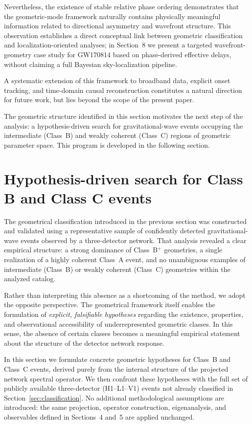 \documentclass[11pt,a4paper]{article}
\begin{document}
Nevertheless, the existence of stable relative phase ordering demonstrates that the
geometric-mode framework naturally contains physically meaningful information related to
directional asymmetry and wavefront structure.
This observation establishes a direct conceptual link between geometric classification
and localization-oriented analyses; in Section~8 we present a targeted wavefront-geometry
case study for GW170814 based on phase-derived effective delays, without claiming a full
Bayesian sky-localization pipeline.

A systematic extension of this framework to broadband data, explicit onset tracking, and
time-domain causal reconstruction constitutes a natural direction for future work, but
lies beyond the scope of the present paper.

The geometric structure identified in this section motivates the next step of the
analysis: a hypothesis-driven search for gravitational-wave events occupying the
intermediate (Class~B) and weakly coherent (Class~C) regions of geometric parameter space.
This program is developed in the following section.


\section{Hypothesis-driven search for Class B and Class C events}

The geometrical classification introduced in the previous section was constructed and
validated using a representative sample of confidently detected gravitational-wave
events observed by a three-detector network.
That analysis revealed a clear empirical structure: a strong dominance of
Class~B$^+$ geometries, a single realization of a highly coherent Class~A event, and
no unambiguous examples of intermediate (Class~B) or weakly coherent (Class~C)
geometries within the analyzed catalog.

Rather than interpreting this absence as a shortcoming of the method, we adopt the
opposite perspective.
The geometrical framework itself enables the formulation of \emph{explicit, falsifiable
hypotheses} regarding the existence, properties, and observational accessibility of
underrepresented geometric classes.
In this sense, the absence of certain classes becomes a meaningful empirical statement
about the structure of the detector network response.

In this section we formulate concrete geometric hypotheses for Class~B and Class~C
events, derived purely from the internal structure of the projected network spectral
operator.
We then confront these hypotheses with the full set of publicly available
three-detector (H1--L1--V1) events not already classified in Section~\ref{sec:classification}.
No additional methodological assumptions are introduced: the same projection,
operator construction, eigenanalysis, and observables defined in Sections~4 and~5 are
applied unchanged.
\end{document}
